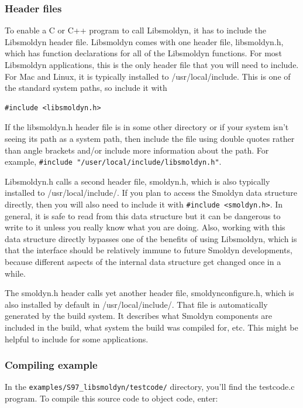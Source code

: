 \documentclass {scrbook}
\newcommand {\ttt} {\texttt}
\begin{document}
\subsubsection*{Header files}
To enable a C or C++ program to call Libsmoldyn, it has to include the Libsmoldyn header file. Libsmoldyn comes with one header file, libsmoldyn.h, which has function declarations for all of the Libsmoldyn functions. For most Libsmoldyn applications, this is the only header file that you will need to include. For Mac and Linux, it is typically installed to /usr/local/include. This is one of the standard system paths, so include it with

\begin{lstlisting}[style=SSAC]
#include <libsmoldyn.h>
\end{lstlisting}

If the libsmoldyn.h header file is in some other directory or if your system isn't seeing its path as a system path, then include the file using double quotes rather than angle brackets and/or include more information about the path. For example, \lstinline{#include "/user/local/include/libsmoldyn.h"}.

Libsmoldyn.h calls a second header file, smoldyn.h, which is also typically installed to /usr/local/include/. If you plan to access the Smoldyn data structure directly, then you will also need to include it with \lstinline{#include <smoldyn.h>}. In general, it is safe to read from this data structure but it can be dangerous to write to it unless you really know what you are doing. Also, working with this data structure directly bypasses one of the benefits of using Libsmoldyn, which is that the interface should be relatively immune to future Smoldyn developments, because different aspects of the internal data structure get changed once in a while.

The smoldyn.h header calls yet another header file, smoldynconfigure.h, which is also installed by default in /usr/local/include/. That file is automatically generated by the build system. It describes what Smoldyn components are included in the build, what system the build was compiled for, etc. This might be helpful to include for some applications.

\subsubsection*{Compiling example}
In the \ttt{examples/S97\_libsmoldyn/testcode/} directory, you'll find the testcode.c program. To compile this source code to object code, enter:
\end{document}
